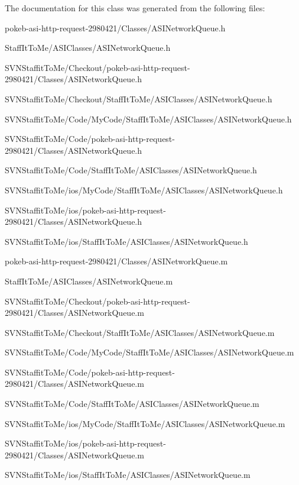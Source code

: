 \-The documentation for this class was generated from the following files\-:\begin{DoxyCompactItemize}
\item 
pokeb-\/asi-\/http-\/request-\/2980421/\-Classes/\-A\-S\-I\-Network\-Queue.\-h\item 
\-Staff\-It\-To\-Me/\-A\-S\-I\-Classes/\-A\-S\-I\-Network\-Queue.\-h\item 
\-S\-V\-N\-Staffit\-To\-Me/\-Checkout/pokeb-\/asi-\/http-\/request-\/2980421/\-Classes/\-A\-S\-I\-Network\-Queue.\-h\item 
\-S\-V\-N\-Staffit\-To\-Me/\-Checkout/\-Staff\-It\-To\-Me/\-A\-S\-I\-Classes/\-A\-S\-I\-Network\-Queue.\-h\item 
\-S\-V\-N\-Staffit\-To\-Me/\-Code/\-My\-Code/\-Staff\-It\-To\-Me/\-A\-S\-I\-Classes/\-A\-S\-I\-Network\-Queue.\-h\item 
\-S\-V\-N\-Staffit\-To\-Me/\-Code/pokeb-\/asi-\/http-\/request-\/2980421/\-Classes/\-A\-S\-I\-Network\-Queue.\-h\item 
\-S\-V\-N\-Staffit\-To\-Me/\-Code/\-Staff\-It\-To\-Me/\-A\-S\-I\-Classes/\-A\-S\-I\-Network\-Queue.\-h\item 
\-S\-V\-N\-Staffit\-To\-Me/ios/\-My\-Code/\-Staff\-It\-To\-Me/\-A\-S\-I\-Classes/\-A\-S\-I\-Network\-Queue.\-h\item 
\-S\-V\-N\-Staffit\-To\-Me/ios/pokeb-\/asi-\/http-\/request-\/2980421/\-Classes/\-A\-S\-I\-Network\-Queue.\-h\item 
\-S\-V\-N\-Staffit\-To\-Me/ios/\-Staff\-It\-To\-Me/\-A\-S\-I\-Classes/\-A\-S\-I\-Network\-Queue.\-h\item 
pokeb-\/asi-\/http-\/request-\/2980421/\-Classes/\-A\-S\-I\-Network\-Queue.\-m\item 
\-Staff\-It\-To\-Me/\-A\-S\-I\-Classes/\-A\-S\-I\-Network\-Queue.\-m\item 
\-S\-V\-N\-Staffit\-To\-Me/\-Checkout/pokeb-\/asi-\/http-\/request-\/2980421/\-Classes/\-A\-S\-I\-Network\-Queue.\-m\item 
\-S\-V\-N\-Staffit\-To\-Me/\-Checkout/\-Staff\-It\-To\-Me/\-A\-S\-I\-Classes/\-A\-S\-I\-Network\-Queue.\-m\item 
\-S\-V\-N\-Staffit\-To\-Me/\-Code/\-My\-Code/\-Staff\-It\-To\-Me/\-A\-S\-I\-Classes/\-A\-S\-I\-Network\-Queue.\-m\item 
\-S\-V\-N\-Staffit\-To\-Me/\-Code/pokeb-\/asi-\/http-\/request-\/2980421/\-Classes/\-A\-S\-I\-Network\-Queue.\-m\item 
\-S\-V\-N\-Staffit\-To\-Me/\-Code/\-Staff\-It\-To\-Me/\-A\-S\-I\-Classes/\-A\-S\-I\-Network\-Queue.\-m\item 
\-S\-V\-N\-Staffit\-To\-Me/ios/\-My\-Code/\-Staff\-It\-To\-Me/\-A\-S\-I\-Classes/\-A\-S\-I\-Network\-Queue.\-m\item 
\-S\-V\-N\-Staffit\-To\-Me/ios/pokeb-\/asi-\/http-\/request-\/2980421/\-Classes/\-A\-S\-I\-Network\-Queue.\-m\item 
\-S\-V\-N\-Staffit\-To\-Me/ios/\-Staff\-It\-To\-Me/\-A\-S\-I\-Classes/\-A\-S\-I\-Network\-Queue.\-m\end{DoxyCompactItemize}
